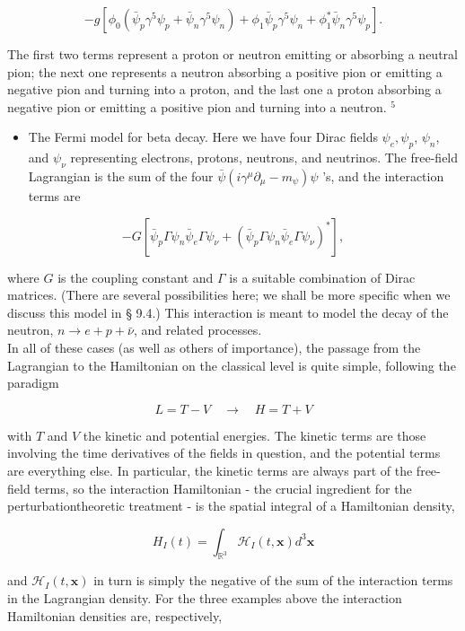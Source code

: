 \documentclass[10pt, letterpaper]{article}
\begin{document}
$$
-g\left[\phi_{0}\left(\bar{\psi}_{p} \gamma^{5} \psi_{p}+\bar{\psi}_{n} \gamma^{5} \psi_{n}\right)+\phi_{1} \bar{\psi}_{p} \gamma^{5} \psi_{n}+\phi_{1}^{*} \bar{\psi}_{n} \gamma^{5} \psi_{p}\right] .
$$

The first two terms represent a proton or neutron emitting or absorbing a neutral pion; the next one represents a neutron absorbing a positive pion or emitting a negative pion and turning into a proton, and the last one a proton absorbing a negative pion or emitting a positive pion and turning into a neutron. ${ }^{5}$

\begin{itemize}
  \item The Fermi model for beta decay. Here we have four Dirac fields $\psi_{e}, \psi_{p}$, $\psi_{n}$, and $\psi_{\nu}$ representing electrons, protons, neutrons, and neutrinos. The free-field Lagrangian is the sum of the four $\bar{\psi}\left(i \gamma^{\mu} \partial_{\mu}-m_{\psi}\right) \psi$ 's, and the interaction terms are
\end{itemize}

$$
-G\left[\bar{\psi}_{p} \Gamma \psi_{n} \bar{\psi}_{e} \Gamma \psi_{\nu}+\left(\bar{\psi}_{p} \Gamma \psi_{n} \bar{\psi}_{e} \Gamma \psi_{\nu}\right)^{*}\right],
$$

where $G$ is the coupling constant and $\Gamma$ is a suitable combination of Dirac matrices. (There are several possibilities here; we shall be more specific when we discuss this model in § 9.4.) This interaction is meant to model the decay of the neutron, $n \rightarrow e+p+\bar{\nu}$, and related processes.\\
In all of these cases (as well as others of importance), the passage from the Lagrangian to the Hamiltonian on the classical level is quite simple, following the paradigm

$$
L=T-V \quad \longrightarrow \quad H=T+V
$$

with $T$ and $V$ the kinetic and potential energies. The kinetic terms are those involving the time derivatives of the fields in question, and the potential terms are everything else. In particular, the kinetic terms are always part of the free-field terms, so the interaction Hamiltonian - the crucial ingredient for the perturbationtheoretic treatment - is the spatial integral of a Hamiltonian density,

$$
H_{I}(t)=\int_{\mathbb{R}^{3}} \mathcal{H}_{I}(t, \mathbf{x}) d^{3} \mathbf{x}
$$

and $\mathcal{H}_{I}(t, \mathbf{x})$ in turn is simply the negative of the sum of the interaction terms in the Lagrangian density. For the three examples above the interaction Hamiltonian densities are, respectively,
\end{document}
